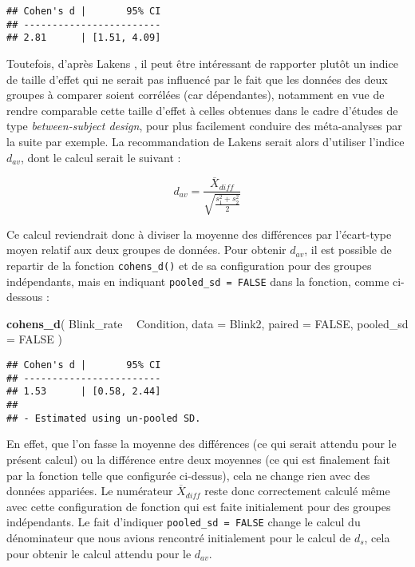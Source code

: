 \documentclass[
  french,
]{book}
\newenvironment{Shaded}{\begin{snugshade}}{\end{snugshade}}
\newcommand{\DataTypeTok}[1]{\textcolor[rgb]{0.13,0.29,0.53}{#1}}
\newcommand{\KeywordTok}[1]{\textcolor[rgb]{0.13,0.29,0.53}{\textbf{#1}}}
\newcommand{\NormalTok}[1]{#1}
\newcommand{\OperatorTok}[1]{\textcolor[rgb]{0.81,0.36,0.00}{\textbf{#1}}}
\newcommand{\OtherTok}[1]{\textcolor[rgb]{0.56,0.35,0.01}{#1}}
\newcommand{\StringTok}[1]{\textcolor[rgb]{0.31,0.60,0.02}{#1}}
\begin{document}
\begin{verbatim}
## Cohen's d |       95% CI
## ------------------------
## 2.81      | [1.51, 4.09]
\end{verbatim}

Toutefois, d'après Lakens \autocite*{lakensCalculatingReportingEffect2013}, il peut être intéressant de rapporter plutôt un indice de taille d'effet qui ne serait pas influencé par le fait que les données des deux groupes à comparer soient corrélées (car dépendantes), notamment en vue de rendre comparable cette taille d'effet à celles obtenues dans le cadre d'études de type \emph{between-subject design}, pour plus facilement conduire des méta-analyses par la suite par exemple. La recommandation de Lakens \autocite*{lakensCalculatingReportingEffect2013} serait alors d'utiliser l'indice \(d_{av}\), dont le calcul serait le suivant :

\[d_{av} = \frac{\overline{X} _{diff}}{\sqrt{\frac{s_{1}^2 + s_{2}^2} {2}}}\]

Ce calcul reviendrait donc à diviser la moyenne des différences par l'écart-type moyen relatif aux deux groupes de données. Pour obtenir \(d_{av}\), il est possible de repartir de la fonction \texttt{cohens\_d()} et de sa configuration pour des groupes indépendants, mais en indiquant \texttt{pooled\_sd\ =\ FALSE} dans la fonction, comme ci-dessous :

\begin{Shaded}
\begin{Highlighting}[]
\KeywordTok{cohens_d}\NormalTok{(}
\NormalTok{  Blink_rate }\OperatorTok{~}\StringTok{ }\NormalTok{Condition,}
  \DataTypeTok{data =}\NormalTok{ Blink2, }
  \DataTypeTok{paired =} \OtherTok{FALSE}\NormalTok{, }
  \DataTypeTok{pooled_sd =} \OtherTok{FALSE}
\NormalTok{  )}
\end{Highlighting}
\end{Shaded}

\begin{verbatim}
## Cohen's d |       95% CI
## ------------------------
## 1.53      | [0.58, 2.44]
## 
## - Estimated using un-pooled SD.
\end{verbatim}

En effet, que l'on fasse la moyenne des différences (ce qui serait attendu pour le présent calcul) ou la différence entre deux moyennes (ce qui est finalement fait par la fonction telle que configurée ci-dessus), cela ne change rien avec des données appariées. Le numérateur \(\overline{X} _{diff}\) reste donc correctement calculé même avec cette configuration de fonction qui est faite initialement pour des groupes indépendants. Le fait d'indiquer \texttt{pooled\_sd\ =\ FALSE} change le calcul du dénominateur que nous avions rencontré initialement pour le calcul de \(d_{s}\), cela pour obtenir le calcul attendu pour le \(d_{av}\).
\end{document}
